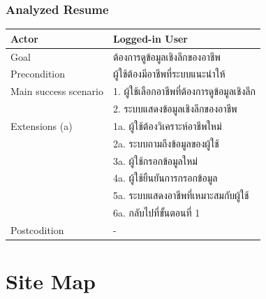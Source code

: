 \subsubsection{Analyzed Resume}
\begin{table}[!h]
    \begin{tabular}{|l|l|} \hline
        Actor                 & Logged-in User                  \\ \hline
        Goal                  & ต้องการดูข้อมูลเชิงลึกของอาชีพ         \\ \hline
        Precondition          & ผู้ใช้ต้องมีอาชีพที่ระบบแนะนำให้          \\ \hline
        Main success scenario & 1. ผู้ใช้เลือกอาชีพที่ต้องการดูข้อมูลเชิงลึก \\
                              & 2. ระบบแสดงข้อมูลเชิงลึกของอาชีพ     \\ \hline
        Extensions (a)        & 1a. ผู้ใช้ต้องวิเคราะห์อาชีพใหม่        \\
                              & 2a. ระบบถามถึงข้อมูลของผู้ใช้         \\
                              & 3a. ผู้ใช้กรอกข้อมูลใหม่              \\
                              & 4a. ผู้ใช้ยืนยันการกรอกข้อมูล          \\
                              & 5a. ระบบแสดงอาชีพที่เหมาะสมกับผู้ใช้   \\
                              & 6a. กลับไปที่ขั้นตอนที่ 1              \\ \hline
        Postcodition          & -                               \\ \hline
    \end{tabular}
\end{table}

\newpage

\section{Site Map}
\begin{figure}[h]\centering
    \setlength{\fboxrule}{0.2mm} %
    \setlength{\fboxsep}{0.5cm}
    \label{fig:siteMap}
\end{figure}

